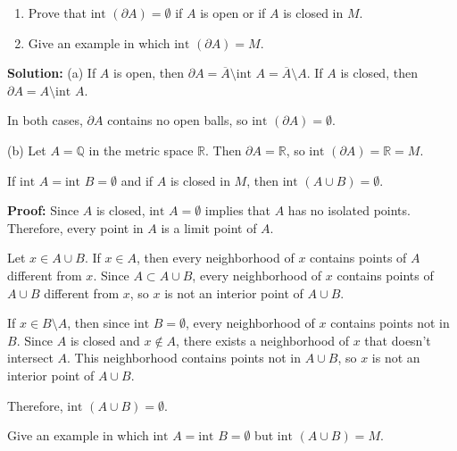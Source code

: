 \begin{problembox}
\begin{enumerate}[label=\alph*)]
\item Prove that \(\text{int } (\partial A) = \emptyset\) if \( A \) is open or if \( A \) is closed in \( M \).
\item Give an example in which \(\text{int } (\partial A) = M\).
\end{enumerate}
\end{problembox}

\textbf{Solution:} 
(a) If $A$ is open, then $\partial A = \overline{A} \setminus \text{int } A = \overline{A} \setminus A$. If $A$ is closed, then $\partial A = A \setminus \text{int } A$.

In both cases, $\partial A$ contains no open balls, so $\text{int } (\partial A) = \emptyset$.

(b) Let $A = \mathbb{Q}$ in the metric space $\mathbb{R}$. Then $\partial A = \mathbb{R}$, so $\text{int } (\partial A) = \mathbb{R} = M$.

\begin{problembox}
If \(\text{int } A = \text{int } B = \emptyset\) and if \(A\) is closed in \(M\), then \(\text{int } (A \cup B) = \emptyset\).
\end{problembox}

\textbf{Proof:} Since $A$ is closed, $\text{int } A = \emptyset$ implies that $A$ has no isolated points. Therefore, every point in $A$ is a limit point of $A$.

Let $x \in A \cup B$. If $x \in A$, then every neighborhood of $x$ contains points of $A$ different from $x$. Since $A \subset A \cup B$, every neighborhood of $x$ contains points of $A \cup B$ different from $x$, so $x$ is not an interior point of $A \cup B$.

If $x \in B \setminus A$, then since $\text{int } B = \emptyset$, every neighborhood of $x$ contains points not in $B$. Since $A$ is closed and $x \notin A$, there exists a neighborhood of $x$ that doesn't intersect $A$. This neighborhood contains points not in $A \cup B$, so $x$ is not an interior point of $A \cup B$.

Therefore, $\text{int } (A \cup B) = \emptyset$.

\begin{problembox}
Give an example in which \(\text{int } A = \text{int } B = \emptyset\) but \(\text{int } (A \cup B) = M\).
\end{problembox}

